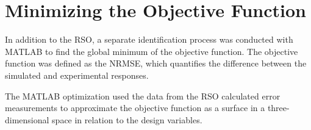 
\section{Minimizing the Objective Function}

In addition to the RSO, a separate identification process was conducted with MATLAB to find the global minimum of 
the objective function. The objective function was defined as the NRMSE, which quantifies the difference 
between the simulated and experimental responses.

The MATLAB optimization used the data from the RSO calculated error measurements to approximate 
the objective function as a surface in a three-dimensional space in relation to the design variables. 

